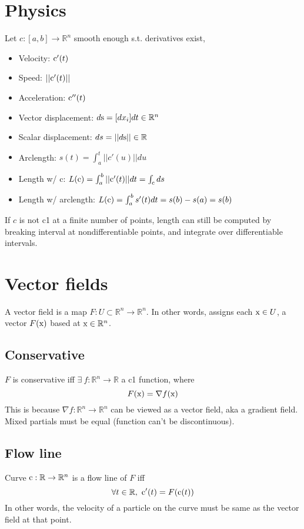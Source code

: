 \section*{Physics}
Let $c:[a,b]\to \mathbb{R}^n$ smooth enough s.t. derivatives exist,
\begin{itemize}
    \item Velocity: $\textrm{c}'(t)$
    \item Speed: $||\textrm{c}'(t)||$
    \item Acceleration: $\textrm{c}''(t)$
    \item Vector displacement: $d\textrm{s}=[dx_i]dt \in \mathbb{R}^n$
    \item Scalar displacement: $ds = ||d\textrm{s}|| \in \mathbb{R}$
    \item Arclength: $s(t) = \int_{a}^{t}||c'(u)|| du$
    \item Length w/ c: $L(\textrm{c}) = \int_{a}^{b}||\textrm{c}'(t)||dt = \int_{\textrm{c}} ds$
    \item Length w/ arclength: $L(\textrm{c}) = \int_{a}^{b}s'(t)dt = s(b) - s(a)=s(b)$
\end{itemize}{}
If $c$ is not c1 at a finite number of points, length can still be computed by breaking interval at nondifferentiable points, and integrate over differentiable intervals.

\section*{Vector fields}
A vector field is a map $F:U\subset \mathbb{R}^n\to \mathbb{R}^n$. In other words, assigns each $\textrm{x}\in U$, a vector  $F(\textrm{x})$ based at $\textrm{x} \in \mathbb{R}^n$.
\subsection*{Conservative}
$F$ is conservative iff $\exists ~f : \mathbb{R}^n\to\mathbb{R}$ a c1 function, where
$$F(\textrm{x})=\nabla f(\textrm{x})$$
This is because $\nabla f:\mathbb{R}^n\to \mathbb{R}^n$ can be viewed as a vector field, aka a gradient field. Mixed partials must be equal (function can't be discontinuous).

\subsection*{Flow line}
Curve $\textrm{c}:\mathbb{R}\to\mathbb{R}^n$ is a flow line of $F$ iff
$$\forall t \in \mathbb{R},~ \textrm{c}'(t) = F(\textrm{c}(t))$$
In other words, the velocity of a particle on the curve must be same as the vector field at that point.

